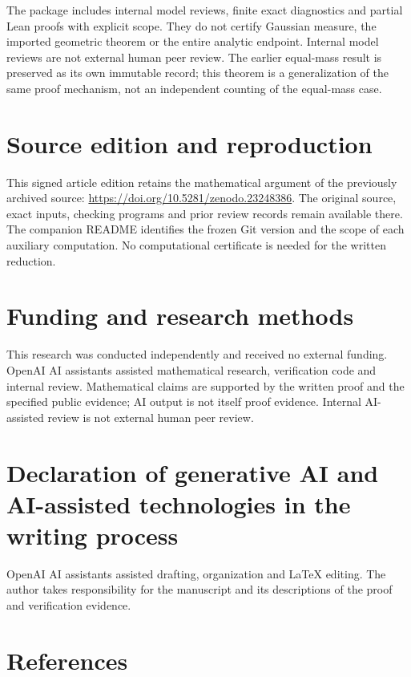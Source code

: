 \documentclass[
  11pt,
]{article}
\begin{document}
The package includes internal model reviews, finite exact diagnostics
and partial Lean proofs with explicit scope. They do not certify
Gaussian measure, the imported geometric theorem or the entire analytic
endpoint. Internal model reviews are not external human peer review. The
earlier equal-mass result is preserved as its own immutable record; this
theorem is a generalization of the same proof mechanism, not an
independent counting of the equal-mass case.


\section*{Source edition and reproduction}
This signed article edition retains the mathematical argument of the
previously archived source: \url{https://doi.org/10.5281/zenodo.23248386}.
The original source, exact inputs, checking programs and prior review
records remain available there. The companion README identifies the
frozen Git version and the scope of each auxiliary computation.
No computational certificate is needed for the written reduction.

\section*{Funding and research methods}
This research was conducted independently and received no external
funding. OpenAI AI assistants assisted mathematical research, verification
code and internal review. Mathematical claims are supported by the
written proof and the specified public evidence; AI output is not itself
proof evidence. Internal AI-assisted review is not external human peer
review.
\section*{Declaration of generative AI and AI-assisted technologies
in the writing process}
OpenAI AI assistants assisted drafting, organization and LaTeX editing.
The author takes responsibility for the manuscript and its descriptions
of the proof and verification evidence.

\section{References}\label{references}
\end{document}
